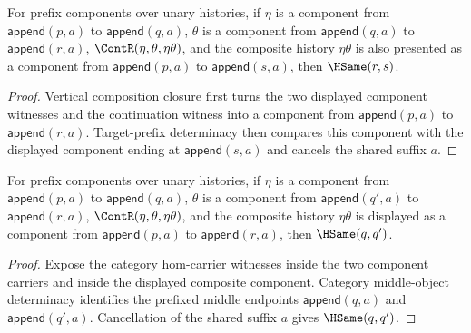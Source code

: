 \begin{theorem}
\label{thm:nattrans-prefix-component-carrier-vert-comp-target-prefix-deterministic}
For prefix components over unary histories, if $\eta$ is a component from
$\mathsf{append}(p,a)$ to $\mathsf{append}(q,a)$, $\theta$ is a component from
$\mathsf{append}(q,a)$ to $\mathsf{append}(r,a)$,
$\ContR(\eta,\theta,\eta\theta)$, and the composite history $\eta\theta$ is
also presented as a component from $\mathsf{append}(p,a)$ to
$\mathsf{append}(s,a)$, then $\HSame(r,s)$.
\end{theorem}
\begin{proof}
Vertical composition closure first turns the two displayed component witnesses
and the continuation witness into a component from $\mathsf{append}(p,a)$ to
$\mathsf{append}(r,a)$. Target-prefix determinacy then compares this component
with the displayed component ending at $\mathsf{append}(s,a)$ and cancels the
shared suffix $a$.
\end{proof}

\begin{theorem}
\label{thm:nattrans-prefix-component-vert-comp-middle-prefix-deterministic}
For prefix components over unary histories, if \(\eta\) is a component from
\(\mathsf{append}(p,a)\) to \(\mathsf{append}(q,a)\), \(\theta\) is a
component from \(\mathsf{append}(q',a)\) to \(\mathsf{append}(r,a)\),
\(\ContR(\eta,\theta,\eta\theta)\), and the composite history
\(\eta\theta\) is displayed as a component from \(\mathsf{append}(p,a)\) to
\(\mathsf{append}(r,a)\), then \(\HSame(q,q')\).
\end{theorem}
\begin{proof}
Expose the category hom-carrier witnesses inside the two component carriers
and inside the displayed composite component. Category middle-object
determinacy identifies the prefixed middle endpoints
\(\mathsf{append}(q,a)\) and \(\mathsf{append}(q',a)\). Cancellation of the
shared suffix \(a\) gives \(\HSame(q,q')\).
\end{proof}


